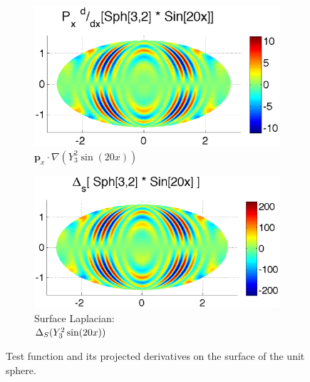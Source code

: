 \begin{figure}
\begin{center}
	\begin{subfigure}[t]{0.48\textwidth}
		\centering
	\includegraphics[width=1.0\textwidth]{../figures/appendices/direct_vs_indirect_weights/compare_weight_generation/xsfc_vs_xsfc_alt_on_sph32_times_sine_20x/pdx_sph32_times_sin20x.eps}
	\caption{$\mathbf{p}_{x} \cdot \nabla ( Y_{3}^{2} \sin(20 x))$ }
			\label{fig:direct_vs_indirect_manufactured_xsfc}
	\end{subfigure}
	\begin{subfigure}[t]{0.48\textwidth}
		\centering
	\includegraphics[width=1.0\textwidth]{../figures/appendices/direct_vs_indirect_weights/compare_weight_generation/lsfc_vs_px_grad_dot_px_grad/lsfc_sph32_times_sin20x.eps}
	\caption{Surface Laplacian: \\ $\Delta_S ( Y_{3}^{2} \sin(20 x) )$  }
				\label{fig:direct_vs_indirect_manufactured_lsfc}
	\end{subfigure}
	\caption{Test function and its projected derivatives on the surface of the unit sphere. }
				\label{fig:direct_vs_indirect_manufactured_solution}
	\end{center}
\end{figure}


